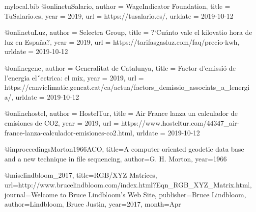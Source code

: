 \usepackage[utf8]{inputenc}
\usepackage[usegeometry]{typearea}
\usepackage[a4paper,headheight=15pt]{geometry}
\usepackage{newtxtext,newtxmath}
\usepackage[scaled=1]{couriers}
\usepackage{amsmath}
\usepackage[english,spanish, catalan]{babel}
\usepackage{microtype}
\usepackage[bottom]{footmisc}
\usepackage{graphicx}
\usepackage{blindtext}
\usepackage{scrextend}
\usepackage{tocloft}
\usepackage{parskip}
\usepackage{multicol}
\usepackage{subcaption}
\usepackage{wrapfig}
\usepackage{multicol}
\usepackage{verbatimbox}
\usepackage[nottoc, notlot, notlof]{tocbibind}
\usepackage{listingsutf8}
\usepackage{url}
\usepackage[sorting=none,maxcitenames=1,natbib=true,backend=bibtex,citestyle=authoryear,doi=false]{biblatex}
\usepackage{adjustbox}
\usepackage[makeroom]{cancel}
\usepackage[Glenn]{fncychap}
\usepackage{lastpage}
\usepackage{fancyhdr}
\usepackage[inline]{enumitem}
\usepackage[framemethod=tikz]{mdframed}
\usepackage[style=english]{csquotes}
\usepackage{array}
\usepackage{float}
\usepackage{pdflscape}
\usepackage{multirow}
\usepackage{afterpage}
\usepackage[toc,page]{appendix}
\usepackage[hidelinks]{hyperref}
\usepackage{tabularx}




\begin{filecontents}{mylocal.bib}
@online{tuSalario,
  author = {WageIndicator Foundation},
  title = {TuSalario.es},
  year = 2019,
  url = {https://tusalario.es/},
  urldate = {2019-10-12}
}

@online{tuLuz,
  author = {Selectra Group},
  title = {{?`}Cu{\'a}nto vale el kilovatio hora de luz en Espa{\~n}a?},
  year = 2019,
  url = {https://tarifasgasluz.com/faq/precio-kwh},
  urldate = {2019-10-12}
}

@online{gene,
  author = {Generalitat de Catalunya},
  title = {Factor d'emissi{\'o} de l'energia el{\'`e}ctrica: el mix},
  year = 2019,
  url = {https://canviclimatic.gencat.cat/ca/actua/factors_demissio_associats_a_lenergia/},
  urldate = {2019-10-12}
}

@online{hostel,
  author = {HostelTur},
  title = {Air France lanza un calculador de emisiones de CO2},
  year = 2019,
  url = {https://www.hosteltur.com/44347_air-france-lanza-calculador-emisiones-co2.html},
  urldate = {2019-10-12}
}

@inproceedings{Morton1966ACO,
  title={A computer oriented geodetic data base and a new technique in file sequencing},
  author={G. H. Morton},
  year={1966}
}

@misc{lindbloom_2017, 
	title={RGB/XYZ Matrices}, 
	url={http://www.brucelindbloom.com/index.html?Eqn_RGB_XYZ_Matrix.html}, 
	journal={Welcome to Bruce Lindbloom's Web Site}, 
	publisher={Bruce Lindbloom}, 
	author={Lindbloom, Bruce Justin}, 
	year={2017}, 
	month={Apr}
}

\end{filecontents}

